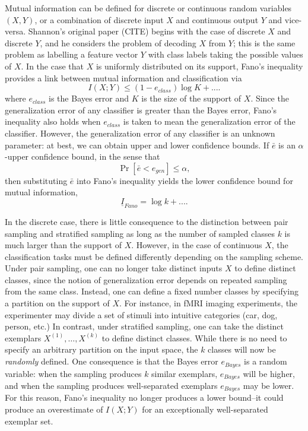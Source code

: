 \documentclass{article}
\begin{document}
Mutual information can be defined for discrete or continuous random variables $(X, Y)$, or a combination of discrete input $X$ and continuous output $Y$ and vice-versa.  Shannon's original paper (CITE) begins
with the case of discrete $X$ and discrete $Y$, and he considers the problem of decoding $X$ from $Y$;
this is the same problem as labelling a feature vector $Y$ with class labels taking the possible values of $X$.
In the case that $X$ is uniformly distributed on its support, Fano's inequality provides a link between mutual information and classification via
\[I(X; Y) \leq (1-e_{class}) \log K + ....\]
where $e_{class}$ is the Bayes error and $K$ is the size of the support of $X$.  Since the generalization error of any classifier is greater than the Bayes error,
Fano's inequality also holds when $e_{class}$ is taken to mean the generalization error of the classifier.
However, the generalization error of any classifier is an unknown parameter:
at best, we can obtain upper and lower confidence bounds.  If $\bar{e}$ is an $\alpha$-upper confidence bound,
in the sense that
\[
\Pr[\bar{e} < e_{gen}] \leq \alpha,
\]
then substituting $\bar{e}$ into Fano's inequality yields the lower confidence bound for mutual information,
\[
\underline{I}_{Fano} = \log k + ....
\]

In the discrete case, there is little consequence to the distinction between pair sampling and stratified sampling as long as the number of sampled classes $k$ is much larger than the support of $X$.
However, in the case of continuous $X$, the classification tasks must be defined differently depending on the sampling scheme.  Under pair sampling, one can no longer take distinct inputs $X$ to define distinct classes, since the notion of generalization error depends on repeated sampling from the same class.  Instead, one can define a fixed number classes by specifying a partition on the support of $X$.  For instance, in fMRI imaging experiments, the experimenter may divide a set of stimuli into intuitive categories (car, dog, person, etc.)  In contrast, under stratified sampling, one can take the distinct exemplars $X^{(1)},\hdots, X^{(k)}$ to define distinct classes.  While there is no need to specify an arbitrary partition on the input space, the $k$ classes will now be \emph{randomly} defined.  One consequence is that the Bayes error $e_{Bayes}$ is a random variable: when the sampling produces $k$ similar exemplars, $e_{Bayes}$ will be higher, and when the sampling produces well-separated exemplars $e_{Bayes}$ may be lower.  For this reason, Fano's inequality no longer produces a lower bound--it could produce an overestimate of $I(X; Y)$ for an exceptionally well-separated exemplar set.
\end{document}

